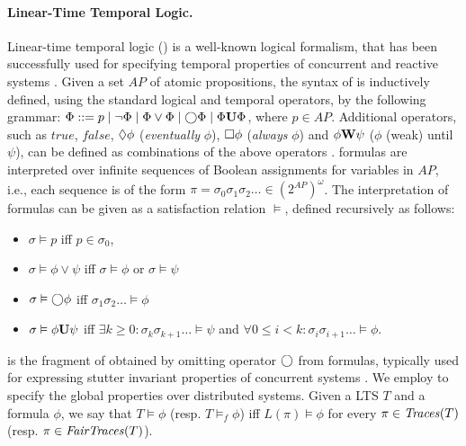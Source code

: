\paragraph{Linear-Time Temporal Logic.}	Linear-time temporal logic ({\LTL}) is a well-known logical formalism, that has been successfully used for specifying temporal properties of concurrent and reactive systems \cite{Katoen08}. Given a set $\textit{AP}$ of atomic propositions, the syntax of {\LTL} is inductively defined, using the standard logical and temporal operators, by the following grammar: $\Phi ::= p \mid \neg \Phi \mid \Phi \vee \Phi \mid  \bigcirc \Phi \mid \Phi \mathbf{U} \Phi$, where $p \in \textit{AP}$. Additional operators, such as $\textit{true}$, $\textit{false}$, $\Diamond \phi$ (\emph{eventually} $\phi$), $\Box \phi$ (\emph{always} $\phi$) and $\phi \mathbf{W} \psi$ ($\phi$ (weak) until $\psi$), can be defined as combinations of the above operators \cite{Katoen08}. {\LTL} formulas are interpreted over infinite sequences of Boolean assignments for variables in $\textit{AP}$, i.e., each sequence is of the form $\pi=\sigma_0 \sigma_1 \sigma_2 \dots \in (2^{\textit{AP}})^{\omega}$. The interpretation of {\LTL} formulas can be given as a satisfaction relation $\vDash$, defined recursively as follows: 
\begin{itemize}
\item $\sigma \vDash p$ iff $p \in \sigma_0$,
\item $\sigma \vDash \phi \vee \psi$ iff $\sigma \vDash \phi$ or $\sigma \vDash \psi$
\item $\sigma \vDash \bigcirc \phi$ iff $\sigma_1 \sigma_2 \dots \vDash \phi$ 
\item $\sigma \vDash \phi \mathbf{U} \psi$ iff   $\exists k \geq 0: \sigma_k \sigma_{k+1} \dots \vDash \psi$ and $\forall 0 \leq i<k: \sigma_i \sigma_{i+1} \dots \vDash \phi$. 
\end{itemize}
{\LTLX} \cite{Katoen08} is the fragment of {\LTL} obtained by omitting operator $\bigcirc$ from formulas, typically used for expressing {\LTL} stutter invariant properties of concurrent systems \cite{PeledWilke1997}. We employ {\LTLX} to specify the global properties over distributed systems. Given a LTS $T$ and a {\LTL} formula $\phi$, we say that $T \vDash \phi$ (resp. $T \vDash_f \phi$) iff $L(\pi) \vDash \phi$ for every $\pi \in \mathit{Traces}(T)$ (resp. $\pi \in \mathit{FairTraces}(T)$). 

